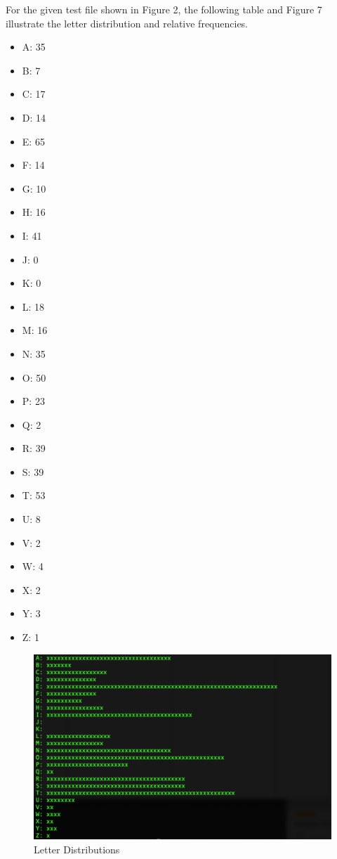 \documentclass[]{article}
\begin{document}
For the given test file shown in Figure 2, the following table and Figure 7 illustrate the letter distribution and relative frequencies.

\begin{multicols}{7}
	\begin{itemize}
		\item A: 35
		\item B: 7
		\item C: 17
		\item D: 14
		\item E: 65
		\item F: 14
		\item G: 10
		\item H: 16
		\item I: 41
		\item J: 0
		\item K: 0
		\item L: 18
		\item M: 16
		\item N: 35
		\item O: 50
		\item P: 23
		\item Q: 2
		\item R: 39
		\item S: 39
		\item T: 53
		\item U: 8
		\item V: 2
		\item W: 4
		\item X: 2
		\item Y: 3
		\item Z: 1
	\end{itemize}
\end{multicols}

\begin{figure}[H]
	\includegraphics[width=\textwidth]{frequency.png}
	\caption{Letter Distributions}
	\centering
\end{figure}
\end{document}
